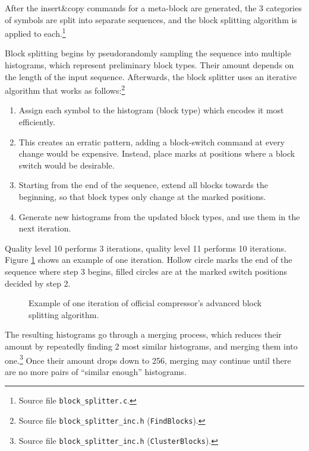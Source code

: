 \documentclass[english,master,dept460,male,cpp,cpdeclaration]{diploma}
\newcommand{\nosep}{\itemsep0em}
\newcommand{\texfigure}[1]{
}
\begin{document}
			After the insert\&copy commands for a meta-block are generated, the 3 categories of symbols are split into separate sequences, and the block splitting algorithm is applied to each.\footnote{Source file \texttt{block\_splitter.c}.}
			
			Block splitting begins by pseudorandomly sampling the sequence into multiple histograms, which represent preliminary block types. Their amount depends on the length of the input sequence. Afterwards, the block splitter uses an iterative algorithm that works as follows:\footnote{Source file \texttt{block\_splitter\_inc.h} (\texttt{FindBlocks}).}
			
			\begin{enumerate} \nosep
				\item Assign each symbol to the histogram (block type) which encodes it most efficiently.
				\item This creates an erratic pattern, adding a block-switch command at every change would be expensive. Instead, place marks at positions where a block switch would be desirable.
				\item Starting from the end of the sequence, extend all blocks towards the beginning, so that block types only change at the marked positions.
				\item Generate new histograms from the updated block types, and use them in the next iteration.
			\end{enumerate}
			
			\noindent
			Quality level 10 performs 3 iterations, quality level 11 performs 10 iterations. Figure \ref{fig:official-block-splitting-iteration-example} shows an example of one iteration. Hollow circle marks the end of the sequence where step 3 begins, filled circles are at the marked switch positions decided by step 2.
			
			\begin{figure}[H]
				\centering
				\texfigure{official-block-splitting-iteration-example}
				\caption{Example of one iteration of official compressor's advanced block splitting algorithm.}
				\label{fig:official-block-splitting-iteration-example}
			\end{figure}
			
			\noindent
			The resulting histograms go through a merging process, which reduces their amount by repeatedly finding 2 most similar histograms, and merging them into one.\footnote{Source file \texttt{block\_splitter\_inc.h} (\texttt{ClusterBlocks}).} Once their amount drops down to 256, merging may continue until there are no more pairs of \enquote{similar enough} histograms.
			
\end{document}
